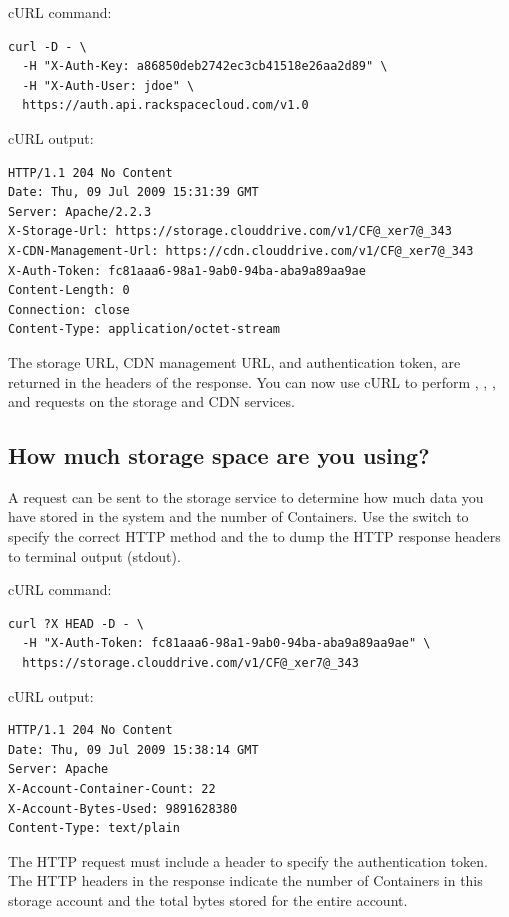 \documentclass[letterpaper,10pt,english]{manual}
\begin{document}
cURL command:

\begin{Verbatim}[commandchars=@\[\]]
curl -D - \
  -H "X-Auth-Key: a86850deb2742ec3cb41518e26aa2d89" \
  -H "X-Auth-User: jdoe" \
  https://auth.api.rackspacecloud.com/v1.0
\end{Verbatim}

cURL output:

\begin{Verbatim}[commandchars=@\[\]]
HTTP/1.1 204 No Content
Date: Thu, 09 Jul 2009 15:31:39 GMT
Server: Apache/2.2.3
X-Storage-Url: https://storage.clouddrive.com/v1/CF@_xer7@_343
X-CDN-Management-Url: https://cdn.clouddrive.com/v1/CF@_xer7@_343
X-Auth-Token: fc81aaa6-98a1-9ab0-94ba-aba9a89aa9ae
Content-Length: 0
Connection: close
Content-Type: application/octet-stream
\end{Verbatim}

The storage URL, CDN management URL, and authentication token,
are returned in the headers of the response. You can now use cURL to
perform , , ,  and  requests on
the storage and CDN services.


\subsection{How much storage space are you using?}

A  request can be sent to the storage service to determine how
much data you have stored in the system and the number of Containers.
Use the  switch to specify the correct HTTP method and the 
to dump the HTTP response headers to terminal output (stdout).

cURL command:

\begin{Verbatim}[commandchars=@\[\]]
curl ?X HEAD -D - \
  -H "X-Auth-Token: fc81aaa6-98a1-9ab0-94ba-aba9a89aa9ae" \
  https://storage.clouddrive.com/v1/CF@_xer7@_343
\end{Verbatim}

cURL output:

\begin{Verbatim}[commandchars=@\[\]]
HTTP/1.1 204 No Content
Date: Thu, 09 Jul 2009 15:38:14 GMT
Server: Apache
X-Account-Container-Count: 22
X-Account-Bytes-Used: 9891628380
Content-Type: text/plain
\end{Verbatim}

The HTTP request must include a header to specify the authentication
token.  The HTTP headers in the response indicate the number of Containers
in this storage account and the total bytes stored for the entire account.
\end{document}
